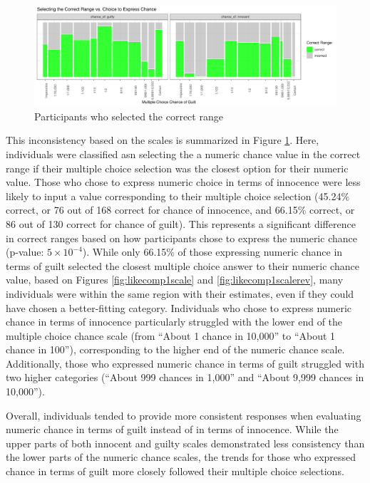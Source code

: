 \documentclass[print]{nuthesis}
\begin{document}
\begin{figure}

{\centering \includegraphics[width=\linewidth]{thesis_files/figure-latex/correctrangemosaic-1} 

}

\caption{Participants who selected the correct range}\label{fig:correctrangemosaic}
\end{figure}

This inconsistency based on the scales is summarized in Figure \ref{fig:correctrangemosaic}.
Here, individuals were classified asn selecting the a numeric chance value in the correct range if their multiple choice selection was the closest option for their numeric value.
Those who chose to express numeric choice in terms of innocence were less likely to input a value corresponding to their multiple choice selection (45.24\% correct, or 76 out of 168 correct for chance of innocence, and 66.15\% correct, or 86 out of 130 correct for chance of guilt).
This represents a significant difference in correct ranges based on how participants chose to express the numeric chance (p-value: \ensuremath{5\times 10^{-4}}).
While only 66.15\% of those expressing numeric chance in terms of guilt selected the closest multiple choice answer to their numeric chance value, based on Figures \ref{fig:likecomp1scale} and \ref{fig:likecomp1scalerev}, many individuals were within the same region with their estimates, even if they could have chosen a better-fitting category.
Individuals who chose to express numeric chance in terms of innocence particularly struggled with the lower end of the multiple choice chance scale (from ``About 1 chance in 10,000'' to ``About 1 chance in 100''), corresponding to the higher end of the numeric chance scale.
Additionally, those who expressed numeric chance in terms of guilt struggled with two higher categories (``About 999 chances in 1,000'' and ``About 9,999 chances in 10,000'').

Overall, individuals tended to provide more consistent responses when evaluating numeric chance in terms of guilt instead of in terms of innocence.
While the upper parts of both innocent and guilty scales demonstrated less consistency than the lower parts of the numeric chance scales, the trends for those who expressed chance in terms of guilt more closely followed their multiple choice selections.
\end{document}
